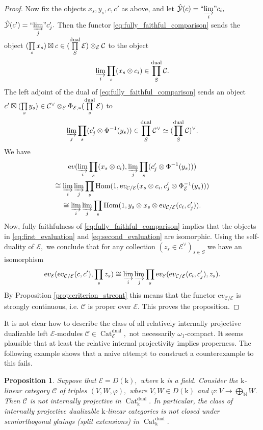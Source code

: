 \documentclass[11pt,leqno]{amsart}
\newtheorem{prop}[theo]{Proposition}
\numberwithin{equation}{section}
\def\N{\mathbb{N}}
\def\Hom{\operatorname{Hom}}
\newcommand{\tens}[1]{%
  \mathbin{\mathop{\otimes}\displaylimits_{#1}}%
}
\newcommand{\indlim}[1][]{\mathop{\varinjlim}\limits_{#1}}
\newcommand{\inddlim}[1][]{{``{\indlim[#1]}"}}
\newcommand{\biggplus}[1][]{\mathop{\bigoplus}\limits_{#1}}
\newcommand{\prodd}[1][]{\mathop{\prod}\limits_{#1}}
\newcommand{\Cat}{\operatorname{Cat}}
\newcommand{\dual}{\operatorname{dual}}
\newcommand{\mk}{\mathrm k}
\newcommand{\ev}{\mathrm ev}
\newcommand{\cC}{{\mathcal C}}
\newcommand{\cE}{{\mathcal E}}
\newcommand{\cY}{{\mathcal Y}}
\begin{document}
\begin{proof}
Now fix the objects $x_s,y_s, c,c'$ as above, and let $\hat{\cY}(c)=\inddlim[i]c_i,$ $\hat{\cY}(c')=\inddlim[j]c'_j.$ Then the functor \eqref{eq:fully_faithful_comparison} sends the object $(\prodd[s]x_s)\boxtimes c\in (\prodd[S]^{\dual}\cE)\tens{\cE}\cC$ to the object
\begin{equation*}
\indlim[i]\prodd[s](x_s\otimes c_i)\in \prodd[S]^{\dual}\cC.
\end{equation*}
The left adjoint of the dual of \eqref{eq:fully_faithful_comparison} sends an object $c'\boxtimes (\prodd[s]y_s)\in \cC^{\vee}\tens{\cE}\Phi_{\cE,*}(\prodd[s]^{\dual}\cE)$ to
\begin{equation*}
\indlim[j]\prodd[s](c_j'\otimes \Phi^{-1}(y_s))\in\prodd[S]^{\dual}\cC^{\vee}\simeq (\prodd[S]^{\dual}\cC)^{\vee}.
\end{equation*}
We have
\begin{multline}\label{eq:second_evaluation}
\ev(\indlim[i]\prodd[s](x_s\otimes c_i),\indlim[j]\prodd[s](c_j'\otimes \Phi^{-1}(y_s)))\\
\cong \indlim[i]\indlim[j]\prodd[s]\Hom(1,\ev_{\cC/\cE}(x_s\otimes c_i,c_j'\otimes\Phi_{\cE}^{-1}(y_s)))\\
\cong \indlim[i]\indlim[j]\prodd[s]\Hom(1,y_s\otimes x_s\otimes \ev_{\cC/\cE}(c_i,c_j')).
\end{multline}
Now, fully faithfulness of \eqref{eq:fully_faithful_comparison} implies that the objects in \eqref{eq:first_evaluation} and \eqref{eq:second_evaluation} are isomorphic. Using the self-duality of $\cE,$ we conclude that for any collection $(z_s\in\cE^{\vee})_{s\in S}$ we have an isomorphism
\begin{equation*}
\ev_{\cE}(\ev_{\cC/\cE}(c,c'),\prodd[s]z_s)\cong \indlim[i]\indlim[j]\prodd[s]\ev_{\cE}(\ev_{\cC/\cE}(c_i,c_j'),z_s).
\end{equation*}
By Proposition \ref{prop:criterion_strcont} this means that the functor $\ev_{\cC/\cE}$ is strongly continuous, i.e. $\cC$ is proper over $\cE.$ This proves the proposition. 
\end{proof}

It is not clear how to describe the class of all relatively internally projective dualizable left 
$\cE$-modules $\cC\in\Cat_{\cE}^{\dual},$ not necessarily $\omega_1$-compact. It seems plausible that at least the relative internal projectivity implies properness. The following example shows that a naive attempt to construct a counterexample to this fails.  

\begin{prop}
Suppose that $\cE=D(\mk),$ where $\mk$ is a field. Consider the $\mk$-linear category $\cC$ of triples $(V,W,\varphi),$ where $V,W\in D(\mk)$ and $\varphi:V\to\biggplus[\N]W.$ Then $\cC$ is not internally projective in $\Cat_{\mk}^{\dual}.$ In particular, the class of internally projective dualizable $\mk$-linear categories is not closed under semiorthogonal gluings (split extensions) in $\Cat_{\mk}^{\dual}.$  
\end{prop}
\end{document}
